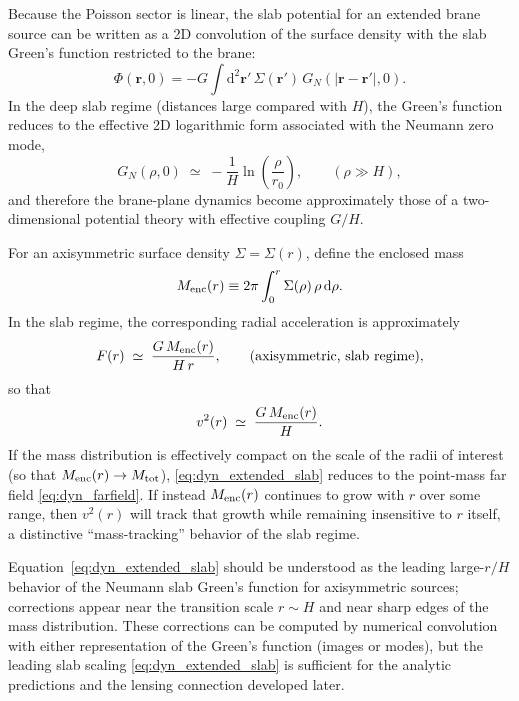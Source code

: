 \documentclass[11pt]{article}
\newcommand{\dd}{\mathrm{d}}
\begin{document}
Because the Poisson sector is linear, the slab potential for an extended brane source can be written
as a 2D convolution of the surface density with the slab Green's function restricted to the brane:
\begin{equation}
  \Phi(\mathbf{r},0) = -G\int \dd^2\mathbf{r}'\,
  \Sigma(\mathbf{r}')\,G_N\!\left(|\mathbf{r}-\mathbf{r}'|,0\right).
\end{equation}
In the deep slab regime (distances large compared with $H$), the Green's function reduces to the
effective 2D logarithmic form associated with the Neumann zero mode,
\begin{equation}
  G_N(\rho,0)\;\simeq\; -\frac{1}{H}\ln\!\left(\frac{\rho}{r_0}\right),
  \qquad (\rho\gg H),
\end{equation}
and therefore the brane-plane dynamics become approximately those of a two-dimensional potential
theory with effective coupling $G/H$.

For an axisymmetric surface density $\Sigma=\Sigma(r)$, define the enclosed mass
\begin{equation}
  M_{\rm enc}(r) \equiv 2\pi \int_0^{r} \Sigma(\rho)\,\rho\,\dd\rho.
\end{equation}
In the slab regime, the corresponding radial acceleration is approximately
\begin{equation}
  F(r)\;\simeq\; \frac{G\,M_{\rm enc}(r)}{H\,r},
  \qquad \text{(axisymmetric, slab regime)},
  \label{eq:dyn_extended_slab}
\end{equation}
so that
\begin{equation}
  v^2(r)\;\simeq\;\frac{G\,M_{\rm enc}(r)}{H}.
  \label{eq:dyn_extended_v2}
\end{equation}
If the mass distribution is effectively compact on the scale of the radii of interest (so that
$M_{\rm enc}(r)\to M_{\rm tot}$), \eqref{eq:dyn_extended_slab} reduces to the point-mass far field
\eqref{eq:dyn_farfield}.  If instead $M_{\rm enc}(r)$ continues to grow with $r$ over some range, then
$v^2(r)$ will track that growth while remaining insensitive to $r$ itself, a distinctive
``mass-tracking'' behavior of the slab regime.

Equation~\eqref{eq:dyn_extended_slab} should be understood as the leading large-$r/H$ behavior of the
Neumann slab Green's function for axisymmetric sources; corrections appear near the transition scale
$r\sim H$ and near sharp edges of the mass distribution.  These corrections can be computed by
numerical convolution with either representation of the Green's function (images or modes), but the
leading slab scaling \eqref{eq:dyn_extended_slab} is sufficient for the analytic predictions and the
lensing connection developed later.
\end{document}
